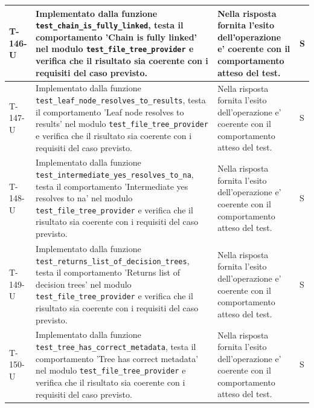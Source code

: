 \documentclass[a4paper,12pt]{article}
\begin{document}
{{\begin{longtable}{|>{\RaggedRight\arraybackslash}p{1.55cm}|>{\RaggedRight\arraybackslash}p{8.0cm}|>{\RaggedRight\arraybackslash}p{4.6cm}|>{\RaggedRight\arraybackslash}p{1.2cm}|}
        \hline
        T-146-U & Implementato dalla funzione \texttt{test\_\allowbreak chain\_\allowbreak is\_\allowbreak fully\_\allowbreak linked}, testa il comportamento 'Chain is fully linked' nel modulo \texttt{test\_\allowbreak file\_\allowbreak tree\_\allowbreak provider} e verifica che il risultato sia coerente con i requisiti del caso previsto. & Nella risposta fornita l'esito dell'operazione e' coerente con il comportamento atteso del test. & S \\
        \hline
        T-147-U & Implementato dalla funzione \texttt{test\_\allowbreak leaf\_\allowbreak node\_\allowbreak resolves\_\allowbreak to\_\allowbreak results}, testa il comportamento 'Leaf node resolves to results' nel modulo \texttt{test\_\allowbreak file\_\allowbreak tree\_\allowbreak provider} e verifica che il risultato sia coerente con i requisiti del caso previsto. & Nella risposta fornita l'esito dell'operazione e' coerente con il comportamento atteso del test. & S \\
        \hline
        T-148-U & Implementato dalla funzione \texttt{test\_\allowbreak intermediate\_\allowbreak yes\_\allowbreak resolves\_\allowbreak to\_\allowbreak na}, testa il comportamento 'Intermediate yes resolves to na' nel modulo \texttt{test\_\allowbreak file\_\allowbreak tree\_\allowbreak provider} e verifica che il risultato sia coerente con i requisiti del caso previsto. & Nella risposta fornita l'esito dell'operazione e' coerente con il comportamento atteso del test. & S \\
        \hline
        T-149-U & Implementato dalla funzione \texttt{test\_\allowbreak returns\_\allowbreak list\_\allowbreak of\_\allowbreak decision\_\allowbreak trees}, testa il comportamento 'Returns list of decision trees' nel modulo \texttt{test\_\allowbreak file\_\allowbreak tree\_\allowbreak provider} e verifica che il risultato sia coerente con i requisiti del caso previsto. & Nella risposta fornita l'esito dell'operazione e' coerente con il comportamento atteso del test. & S \\
        \hline
        T-150-U & Implementato dalla funzione \texttt{test\_\allowbreak tree\_\allowbreak has\_\allowbreak correct\_\allowbreak metadata}, testa il comportamento 'Tree has correct metadata' nel modulo \texttt{test\_\allowbreak file\_\allowbreak tree\_\allowbreak provider} e verifica che il risultato sia coerente con i requisiti del caso previsto. & Nella risposta fornita l'esito dell'operazione e' coerente con il comportamento atteso del test. & S \\

\end{longtable}}}
\end{document}

